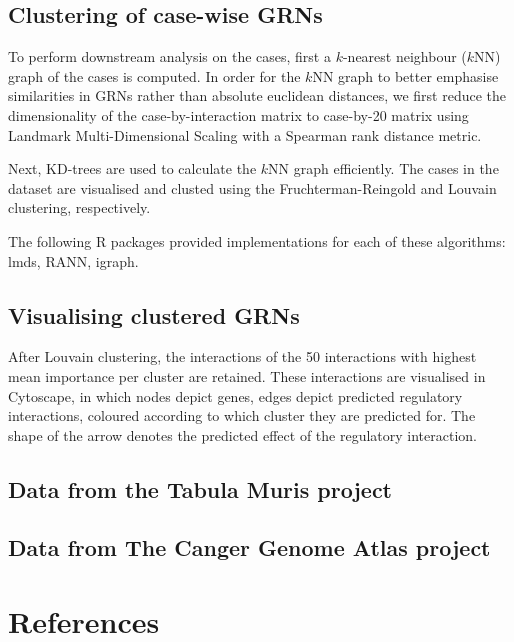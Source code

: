 \subsection{Clustering of case-wise GRNs}
To perform downstream analysis on the cases, first a $k$-nearest neighbour ($k$NN) graph of the cases is computed.
In order for the $k$NN graph to better emphasise similarities in GRNs rather than absolute euclidean distances, we first reduce the dimensionality of the case-by-interaction matrix to case-by-20 matrix using Landmark Multi-Dimensional Scaling\cite{lee_landmarkmdsensemble_2009} with a Spearman rank distance metric.  

Next, KD-trees are used to calculate the $k$NN graph efficiently. The cases in the dataset are visualised and clusted using the Fruchterman-Reingold\cite{fruchterman_graphdrawingforcedirected_1991} and Louvain clustering\cite{blondel_fastunfoldingcommunities_2008}, respectively.

The following R packages provided implementations for each of these algorithms: lmds, RANN, igraph\cite{csardi_igraphsoftwarepackage_2006}.

\subsection{Visualising clustered GRNs}
After Louvain clustering, the interactions of the 50 interactions with highest mean importance per cluster are retained. These interactions are visualised in Cytoscape\cite{shannon_cytoscapesoftwareenvironment_2003}, in which nodes depict genes, edges depict predicted regulatory interactions, coloured according to which cluster they are predicted for. The shape of the arrow denotes the predicted effect of the regulatory interaction.

\subsection{Data from the Tabula Muris project}

\subsection{Data from The Canger Genome Atlas project}

\clearpage
\section{References}
\printbibliography[heading=none]
